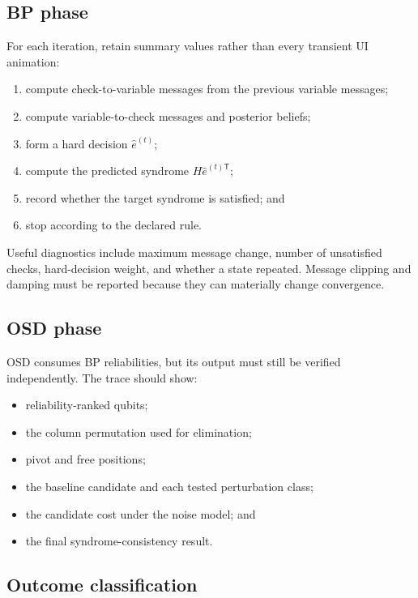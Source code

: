 \documentclass[11pt,letterpaper]{article}
\begin{document}
\subsection{BP phase}

For each iteration, retain summary values rather than every transient UI animation:

\begin{enumerate}
  \item compute check-to-variable messages from the previous variable messages;
  \item compute variable-to-check messages and posterior beliefs;
  \item form a hard decision $\hat e^{(t)}$;
  \item compute the predicted syndrome $H\hat e^{(t)\mathsf T}$;
  \item record whether the target syndrome is satisfied; and
  \item stop according to the declared rule.
\end{enumerate}

Useful diagnostics include maximum message change, number of unsatisfied checks, hard-decision
weight, and whether a state repeated. Message clipping and damping must be reported because they
can materially change convergence.

\subsection{OSD phase}

OSD consumes BP reliabilities, but its output must still be verified independently. The trace
should show:

\begin{itemize}
  \item reliability-ranked qubits;
  \item the column permutation used for elimination;
  \item pivot and free positions;
  \item the baseline candidate and each tested perturbation class;
  \item the candidate cost under the noise model; and
  \item the final syndrome-consistency result.
\end{itemize}

\subsection{Outcome classification}
\end{document}
